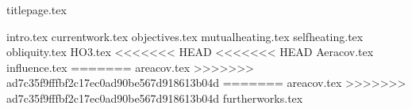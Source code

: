 \documentclass[twoside, twocolumn]{article}
\begin{document}
{titlepage.tex}

{intro.tex}
{currentwork.tex}
{objectives.tex}
{mutualheating.tex}
{selfheating.tex}
{obliquity.tex}
{HO3.tex}
<<<<<<< HEAD
<<<<<<< HEAD
{Aeracov.tex}
{influence.tex}
=======
{areacov.tex}
>>>>>>> ad7c35f9fffbf2c17ec0ad90be567d918613b04d
=======
{areacov.tex}
>>>>>>> ad7c35f9fffbf2c17ec0ad90be567d918613b04d
{furtherworks.tex}

\nocite{*}
\end{document}
